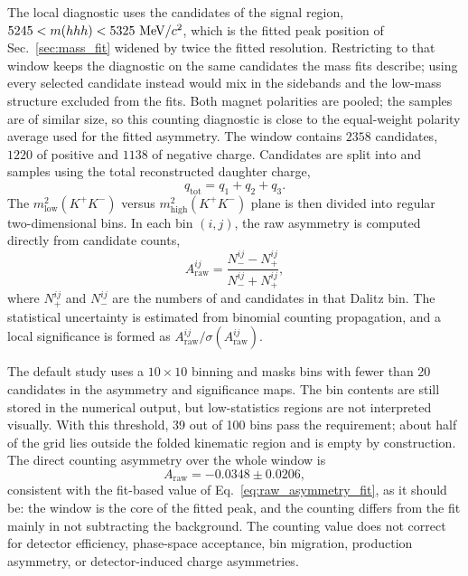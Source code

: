 The local diagnostic uses the candidates of the signal region, $5245 < m(hhh) < 5325~\mathrm{MeV}/c^2$, which is the fitted peak position of Sec.~\ref{sec:mass_fit} widened by twice the fitted resolution. Restricting to that window keeps the diagnostic on the same candidates the mass fits describe; using every selected candidate instead would mix in the sidebands and the low-mass structure excluded from the fits. Both magnet polarities are pooled; the samples are of similar size, so this counting diagnostic is close to the equal-weight polarity average used for the fitted asymmetry. The window contains $2358$ candidates, $1220$ of positive and $1138$ of negative charge. Candidates are split into \Bplus{} and \Bminus{} samples using the total reconstructed daughter charge,
\begin{equation}
  q_{\mathrm{tot}} = q_1 + q_2 + q_3 .
\end{equation}
The $m^2_{\mathrm{low}}(K^+K^-)$ versus $m^2_{\mathrm{high}}(K^+K^-)$ plane is then divided into regular two-dimensional bins. In each bin $(i,j)$, the raw asymmetry is computed directly from candidate counts,
\begin{equation}
  A_{\mathrm{raw}}^{ij}
  =
  \frac{N_-^{ij} - N_+^{ij}}{N_-^{ij} + N_+^{ij}} ,
\end{equation}
where $N_+^{ij}$ and $N_-^{ij}$ are the numbers of \Bplus{} and \Bminus{} candidates in that Dalitz bin. The statistical uncertainty is estimated from binomial counting propagation, and a local significance is formed as $A_{\mathrm{raw}}^{ij}/\sigma(A_{\mathrm{raw}}^{ij})$.

The default study uses a $10\times10$ binning and masks bins with fewer than 20 candidates in the asymmetry and significance maps. The bin contents are still stored in the numerical output, but low-statistics regions are not interpreted visually. With this threshold, 39 out of 100 bins pass the requirement; about half of the grid lies outside the folded kinematic region and is empty by construction. The direct counting asymmetry over the whole window is
\begin{equation}
  A_{\mathrm{raw}} = -0.0348 \pm 0.0206 ,
\end{equation}
consistent with the fit-based value of Eq.~\ref{eq:raw_asymmetry_fit}, as it should be: the window is the core of the fitted peak, and the counting differs from the fit mainly in not subtracting the background. The counting value does not correct for detector efficiency, phase-space acceptance, bin migration, production asymmetry, or detector-induced charge asymmetries.

